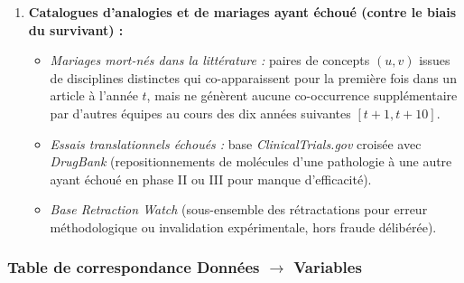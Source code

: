 \documentclass[a4paper,11pt]{article}
\providecommand{\tightlist}{\setlength{\itemsep}{0pt}\setlength{\parskip}{0pt}}
\begin{document}
\begin{enumerate}
  \begin{itemize}
  \tightlist
  \item
    Catalogue historique d'Ogburn et Thomas (1922) ; jeux de données des
    articles associés aux prix Nobel (Li, Yin, Fortunato, \& Wang, 2019)
    ; paires de prépublications indépendantes soumises sur arXiv dans
    une fenêtre \(\Delta t < 30\) jours sans auteurs ni références
    récentes en commun et co-citées ultérieurement comme équivalentes.
  \end{itemize}
\item
  \textbf{Catalogues d'analogies et de mariages ayant échoué (contre le
  biais du survivant) :}

  \begin{itemize}
  \tightlist
  \item
    \emph{Mariages mort-nés dans la littérature :} paires de concepts
    \((u,v)\) issues de disciplines distinctes qui co-apparaissent pour
    la première fois dans un article à l'année \(t\), mais ne génèrent
    aucune co-occurrence supplémentaire par d'autres équipes au cours
    des dix années suivantes \([t+1, t+10]\).
  \item
    \emph{Essais translationnels échoués :} base
    \emph{ClinicalTrials.gov} croisée avec \emph{DrugBank}
    (repositionnements de molécules d'une pathologie à une autre ayant
    échoué en phase II ou III pour manque d'efficacité).
  \item
    \emph{Base Retraction Watch} (sous-ensemble des rétractations pour
    erreur méthodologique ou invalidation expérimentale, hors fraude
    délibérée).
  \end{itemize}
\end{enumerate}

\subsubsection*{\texorpdfstring{Table de correspondance Données \(\to\)
Variables}{Table de correspondance Données \textbackslash to Variables}}
\end{document}

